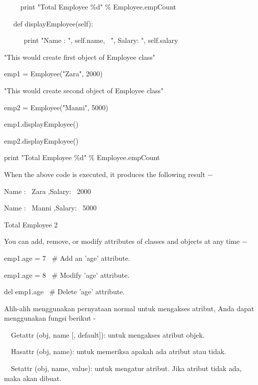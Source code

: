 \documentclass[a4paper,12pt]{report}
\begin{document}
\noindent 
~~~~ print "Total Employee  $  \%  $d"  $  \%  $ Employee.empCount \par
\vspace{12pt}
\noindent 
~~ def displayEmployee(self): \par
\noindent 
~~~~~ print "Name : ", self.name,~ ", Salary: ", self.salary \par
\vspace{12pt}
\noindent 
"This would create first object of Employee class" \par
\noindent 
emp1 = Employee("Zara", 2000) \par
\noindent 
"This would create second object of Employee class" \par
\noindent 
emp2 = Employee("Manni", 5000) \par
\noindent 
emp1.displayEmployee() \par
\noindent 
emp2.displayEmployee() \par
\noindent 
print "Total Employee  $  \%  $d"  $  \%  $ Employee.empCount \par
\noindent 
When the above code is executed, it produces the following result  $ - $ \par
\noindent 
Name :~ Zara ,Salary:~ 2000 \par
\noindent 
Name :~ Manni ,Salary:~ 5000 \par
\noindent 
Total Employee 2 \par
\noindent 
You can add, remove, or modify attributes of classes and objects at any time  $ - $ \par
\noindent 
emp1.age = 7~  $  \#  $ Add an 'age' attribute. \par
\noindent 
emp1.age = 8~  $  \#  $ Modify 'age' attribute. \par
\noindent 
del emp1.age~  $  \#  $ Delete 'age' attribute. \par
\vspace{16pt}
\noindent 
Alih-alih menggunakan pernyataan normal untuk mengakses atribut, Anda dapat menggunakan fungsi berikut - \par
\vspace{12pt}
\noindent 
 $  $ $  $ $  $ $  $Getattr (obj, name [, default]): untuk mengakses atribut objek. \par
\vspace{12pt}
\noindent 
 $  $ $  $ $  $ $  $Hasattr (obj, name): untuk memeriksa apakah ada atribut atau tidak. \par
\vspace{12pt}
\noindent 
 $  $ $  $ $  $ $  $Setattr (obj, name, value): untuk mengatur atribut. Jika atribut tidak ada, maka akan dibuat. \par
\end{document}
